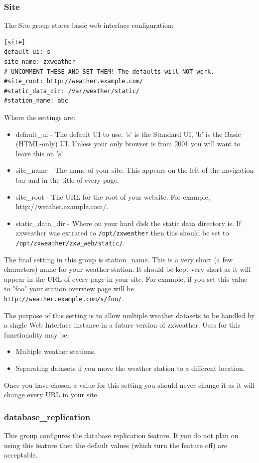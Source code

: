\documentclass[a4paper,10pt,draft]{book}
\begin{document}
\subsubsection{Site}
The Site group stores basic web interface configuration:
\begin{verbatim}
[site]
default_ui: s
site_name: zxweather
# UNCOMMENT THESE AND SET THEM! The defaults will NOT work.
#site_root: http://weather.example.com/
#static_data_dir: /var/weather/static/
#station_name: abc
\end{verbatim}

Where the settings are:
\begin{itemize}
\item default\_ui - The default UI to use. 's' is the Standard UI, 'b' is the Basic (HTML-only) UI. Unless your only browser is from 2001 you will want to leave this on 's'.
\item site\_name - The name of your site. This appears on the left of the navigation bar and in the title of every page.
\item site\_root - The URL for the root of your website. For example, http://weather.example.com/.
\item static\_data\_dir - Where on your hard disk the static data directory is. If zxweather was extrated to \verb|/opt/zxweather| then this should be set to \verb|/opt/zxweather/zxw_web/static/|.
\end{itemize}

The final setting in this group is station\_name. This is a very short (a few characters) name for your weather station. It should be kept very short as it will appear in the URL of every page in your site. For example, if you set this value to "foo" your station overview page will be \verb|http://weather.example.com/s/foo/|.

The purpose of this setting is to allow multiple weather datasets to be handled by a single Web Interface instance in a future version of zxweather. Uses for this functionality may be:
\begin{itemize}
\item Multiple weather stations.
\item Separating datasets if you move the weather station to a different location.
\end{itemize}

Once you have chosen a value for this setting you should never change it as it will change every URL in your site.

\subsubsection{database\_replication}
This group configures the database replication feature. If you do not plan on using this feature then the default values (which turn the feature off) are acceptable.
\end{document}
